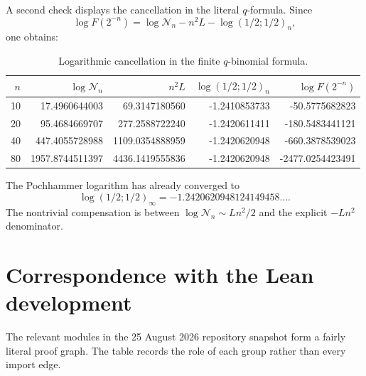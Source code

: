 \documentclass[11pt,oneside]{article}
\theoremstyle{definition}
\theoremstyle{remark}
\begin{document}
A second check displays the cancellation in the literal $q$-formula.  Since
\begin{equation*}
 \log F(2^{-n})=\log\mathcal N_n-n^2L-\log(1/2;1/2)_n,
\end{equation*}
one obtains:

\begin{table}[htbp]
\centering
\small
\begin{tabular}{@{}rrrrr@{}}
\toprule
$n$ & $\log\mathcal N_n$ & $n^2L$ & $\log(1/2;1/2)_n$ & $\log F(2^{-n})$\\
\midrule
10 & 17.4960644003 & 69.3147180560 & -1.2410853733 & -50.5775682823\\
20 & 95.4684669707 & 277.2588722240 & -1.2420611411 & -180.5483441121\\
40 & 447.4055728988& 1109.0354888959& -1.2420620948 & -660.3878539023\\
80 & 1957.8744511397&4436.1419555836& -1.2420620948 & -2477.0254423491\\
\bottomrule
\end{tabular}
\caption{Logarithmic cancellation in the finite $q$-binomial formula.}
\label{dyadicasym:tab:q-cancellation}
\end{table}

The Pochhammer logarithm has already converged to
\begin{equation}
 \log(1/2;1/2)_\infty=-1.2420620948124149458\ldots.         \label{dyadicasym:eq:qpoch-numeric}
\end{equation}
The nontrivial compensation is between $\log\mathcal N_n\sim Ln^2/2$ and the explicit
$-Ln^2$ denominator.

\clearpage
\section{Correspondence with the Lean development}
\label{dyadicasym:sec:lean-map}

The relevant modules in the 25 August 2026 repository snapshot \cite{dyadicasym:proveit2026}
form a fairly literal proof graph.  The table records the role of each group rather than every import edge.
\end{document}
